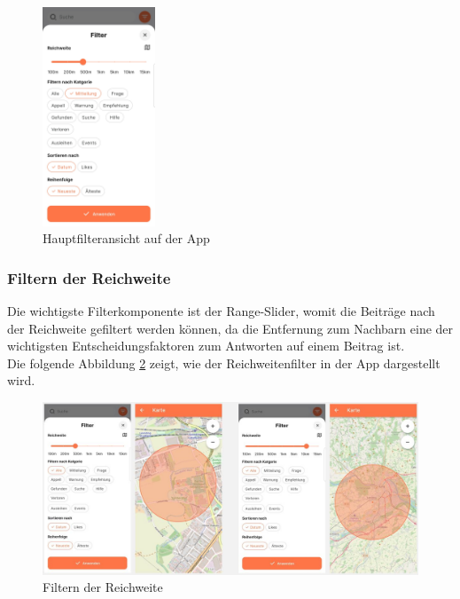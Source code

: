 \begin{figure}[h]
  \centering
  \includegraphics[width=0.3\textwidth]{pics/main-filter.jpg}
  \caption{Hauptfilteransicht auf der App}
  \label{fig:main-filter}
\end{figure}

\subsubsection{Filtern der Reichweite}

Die wichtigste Filterkomponente ist der Range-Slider, womit die Beiträge nach der Reichweite gefiltert werden können, da die Entfernung zum Nachbarn eine der wichtigsten Entscheidungsfaktoren zum Antworten auf einem Beitrag ist.
\\
Die folgende Abbildung \ref{fig:range-filter} zeigt, wie der Reichweitenfilter in der App dargestellt wird.

\begin{figure}[h]
  \centering
  \includegraphics[width=\textwidth]{pics/range-filter.JPG}
  \caption{Filtern der Reichweite}
  \label{fig:range-filter}
\end{figure}

